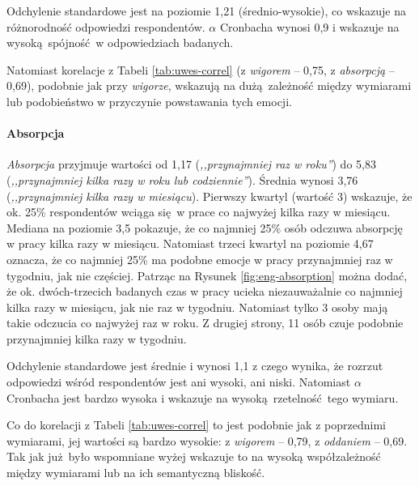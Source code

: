 Odchylenie standardowe jest na poziomie 1,21 (średnio-wysokie), co wskazuje na różnorodność odpowiedzi respondentów. $\alpha$ Cronbacha wynosi 0,9 i wskazuje na wysoką spójność w odpowiedziach badanych.

Natomiast korelacje z Tabeli \ref{tab:uwes-correl} (z \textit{wigorem} -- 0,75, z \textit{absorpcją} -- 0,69), podobnie jak przy \textit{wigorze}, wskazują na dużą zależność między wymiarami lub podobieństwo w przyczynie powstawania tych emocji.

\paragraph{Absorpcja} \textit{Absorpcja} przyjmuje wartości od 1,17 (\textit{,,przynajmniej raz w roku''}) do 5,83 (\textit{,,przynajmniej kilka razy w roku lub codziennie''}). Średnia wynosi 3,76 (\textit{,,przynajmniej kilka razy w miesiącu}). Pierwszy kwartyl (wartość 3) wskazuje, że ok. 25\% respondentów wciąga się w prace co najwyżej kilka razy w miesiącu. Mediana na poziomie 3,5 pokazuje, że co najmniej 25\% osób odczuwa absorpcję w pracy kilka razy w miesiącu. Natomiast trzeci kwartyl na poziomie
4,67 oznacza, że co najmniej 25\% ma podobne emocje w pracy przynajmniej raz w tygodniu, jak nie częściej. Patrząc na Rysunek \ref{fig:eng-absorption} można dodać, że ok. dwóch-trzecich badanych czas w pracy ucieka niezauważalnie co najmniej kilka razy w miesiącu, jak nie raz w tygodniu. Natomiast tylko 3 osoby mają takie odczucia co najwyżej raz w roku. Z drugiej strony, 11 osób czuje podobnie przynajmniej kilka razy w tygodniu.

Odchylenie standardowe jest średnie i wynosi 1,1 z czego wynika, że rozrzut odpowiedzi wśród respondentów jest ani wysoki, ani niski. Natomiast $\alpha$ Cronbacha jest bardzo wysoka i wskazuje na wysoką rzetelność tego wymiaru.

Co do korelacji z Tabeli \ref{tab:uwes-correl} to jest podobnie jak z poprzednimi wymiarami, jej wartości są bardzo wysokie: z \textit{wigorem} -- 0,79, z \textit{oddaniem} -- 0,69. Tak jak już było wspomniane wyżej wskazuje to na wysoką współzależność między wymiarami lub na ich semantyczną bliskość.  

